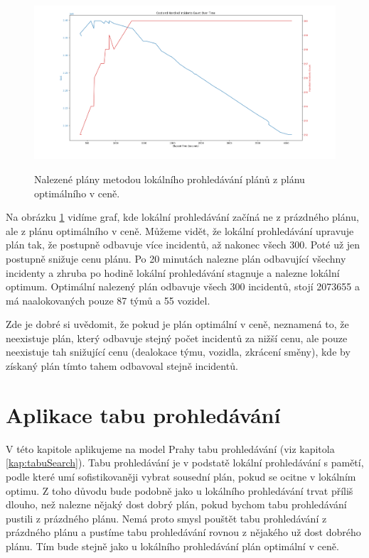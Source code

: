 \begin{figure}[H]
  \caption{Nalezené plány metodou lokálního prohledávání plánů z plánu optimálního v ceně.}
  \includegraphics[width=\textwidth]{img/hybrid_prague.png}
  \centering
  \label{img:hybrid}
\end{figure}

Na obrázku \ref{img:hybrid} vidíme graf, kde lokální prohledávání začíná ne z prázdného plánu, ale z plánu optimálního v ceně.
Můžeme vidět, že lokální prohledávání upravuje plán tak, že postupně odbavuje více incidentů, až nakonec všech 300. Poté už jen postupně snižuje cenu plánu.
Po 20 minutách nalezne plán odbavující všechny incidenty a zhruba po hodině lokální prohledávání stagnuje a nalezne lokální optimum.
Optimální nalezený plán odbavuje všech 300 incidentů, stojí 2073655 a má naalokovaných pouze 87 týmů a 55 vozidel.

Zde je dobré si uvědomit, že pokud je plán optimální v ceně, neznamená to, že neexistuje plán, který odbavuje stejný počet incidentů za nižší cenu,
ale pouze neexistuje tah snižující cenu (dealokace týmu, vozidla, zkrácení směny), kde by získaný plán tímto tahem odbavoval stejně incidentů.

\section{Aplikace tabu prohledávání}

V této kapitole aplikujeme na model Prahy tabu prohledávání (viz kapitola \ref{kap:tabuSearch}).
Tabu prohledávání je v podstatě lokální prohledávání s pamětí, podle které umí sofistikovaněji vybrat sousední plán,
pokud se ocitne v lokálním optimu.
Z toho důvodu bude podobně jako u lokálního prohledávání trvat příliš dlouho, než nalezne nějaký dost dobrý plán, pokud bychom tabu prohledávání pustili z prázdného plánu.
Nemá proto smysl pouštět tabu prohledávání z prázdného plánu a pustíme tabu prohledávání rovnou z nějakého už dost dobrého plánu.
Tím bude stejně jako u lokálního prohledávání plán optimální v ceně.

